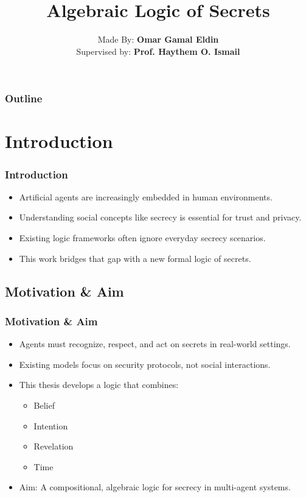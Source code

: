 \documentclass[aspectratio=169]{beamer}
\title{\Huge \textbf{Algebraic Logic of Secrets}}
\author{Made By: \textbf{Omar Gamal Eldin}\\Supervised by: \textbf{Prof. Haythem O. Ismail}}
\institute{}
\date{}
\begin{document}
\frame{\titlepage}


\begin{frame}
\frametitle{Outline}
\tableofcontents[hideallsubsections]
\end{frame}


\section{Introduction}

\begin{frame}
\frametitle{Introduction}
\begin{itemize}
    \item Artificial agents are increasingly embedded in human environments.
    \item Understanding social concepts like secrecy is essential for trust and privacy.
    \item Existing logic frameworks often ignore everyday secrecy scenarios.
    \item This work bridges that gap with a new formal logic of secrets.
\end{itemize}
\end{frame}

\subsection{Motivation \& Aim}

\begin{frame}
\frametitle{Motivation \& Aim}
\begin{itemize}
  \item Agents must recognize, respect, and act on secrets in real-world settings.
  \item Existing models focus on security protocols, not social interactions.
  \item This thesis develops a logic that combines:
  \begin{itemize}
    \item Belief
    \item Intention
    \item Revelation
    \item Time
  \end{itemize}
  \item Aim: A compositional, algebraic logic for secrecy in multi-agent systems.
\end{itemize}
\end{frame}
\end{document}
